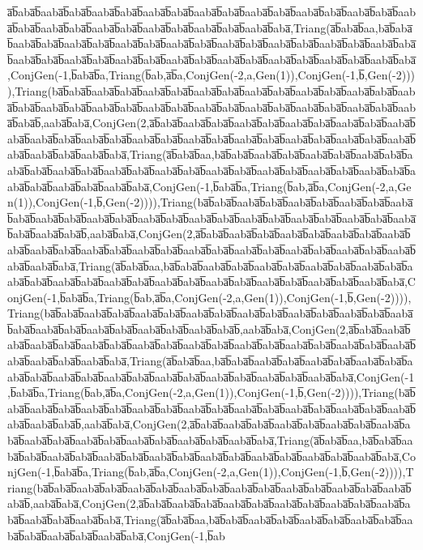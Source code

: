 a̅b̅aba̅b̅aaba̅b̅aba̅b̅aaba̅b̅aba̅b̅aaba̅b̅aba̅b̅aaba̅b̅aba̅b̅aaba̅b̅aba̅b̅aaba̅b̅aba̅b̅aaba̅b̅aba̅b̅aaba̅b̅aba̅b̅aaba̅b̅aba̅b̅aaba̅b̅aba̅b̅aaba̅b̅aba̅b̅aaba̅b̅aba̅b̅aaba̅b̅aba̅,Triang(a̅b̅aba̅b̅aa,ba̅b̅aba̅b̅aaba̅b̅aba̅b̅aaba̅b̅aba̅b̅aaba̅b̅aba̅b̅aaba̅b̅aba̅b̅aaba̅b̅aba̅b̅aaba̅b̅aba̅b̅aaba̅b̅aba̅b̅aaba̅b̅aba̅b̅aaba̅b̅aba̅b̅aaba̅b̅aba̅b̅aaba̅b̅aba̅b̅aaba̅b̅aba̅b̅aaba̅b̅aba̅b̅aaba̅b̅aba̅b̅aaba̅b̅aba̅b̅aaba̅b̅aba̅,ConjGen(-1,b̅aba̅b̅a,Triang(b̅ab,a̅b̅a,ConjGen(-2,a,Gen(1)),ConjGen(-1,b̅,Gen(-2)))),Triang(ba̅b̅aba̅b̅aaba̅b̅aba̅b̅aaba̅b̅aba̅b̅aaba̅b̅aba̅b̅aaba̅b̅aba̅b̅aaba̅b̅aba̅b̅aaba̅b̅aba̅b̅aaba̅b̅aba̅b̅aaba̅b̅aba̅b̅aaba̅b̅aba̅b̅aaba̅b̅aba̅b̅aaba̅b̅aba̅b̅aaba̅b̅aba̅b̅aaba̅b̅aba̅b̅aaba̅b̅aba̅b̅aaba̅b̅aba̅b̅,aaba̅b̅aba̅,ConjGen(2,a̅b̅aba̅b̅aaba̅b̅aba̅b̅aaba̅b̅aba̅b̅aaba̅b̅aba̅b̅aaba̅b̅aba̅b̅aaba̅b̅aba̅b̅aaba̅b̅aba̅b̅aaba̅b̅aba̅b̅aaba̅b̅aba̅b̅aaba̅b̅aba̅b̅aaba̅b̅aba̅b̅aaba̅b̅aba̅b̅aaba̅b̅aba̅b̅aaba̅b̅aba̅b̅aaba̅b̅aba̅b̅aaba̅b̅aba̅,Triang(a̅b̅aba̅b̅aa,ba̅b̅aba̅b̅aaba̅b̅aba̅b̅aaba̅b̅aba̅b̅aaba̅b̅aba̅b̅aaba̅b̅aba̅b̅aaba̅b̅aba̅b̅aaba̅b̅aba̅b̅aaba̅b̅aba̅b̅aaba̅b̅aba̅b̅aaba̅b̅aba̅b̅aaba̅b̅aba̅b̅aaba̅b̅aba̅b̅aaba̅b̅aba̅b̅aaba̅b̅aba̅b̅aaba̅b̅aba̅,ConjGen(-1,b̅aba̅b̅a,Triang(b̅ab,a̅b̅a,ConjGen(-2,a,Gen(1)),ConjGen(-1,b̅,Gen(-2)))),Triang(ba̅b̅aba̅b̅aaba̅b̅aba̅b̅aaba̅b̅aba̅b̅aaba̅b̅aba̅b̅aaba̅b̅aba̅b̅aaba̅b̅aba̅b̅aaba̅b̅aba̅b̅aaba̅b̅aba̅b̅aaba̅b̅aba̅b̅aaba̅b̅aba̅b̅aaba̅b̅aba̅b̅aaba̅b̅aba̅b̅aaba̅b̅aba̅b̅aaba̅b̅aba̅b̅,aaba̅b̅aba̅,ConjGen(2,a̅b̅aba̅b̅aaba̅b̅aba̅b̅aaba̅b̅aba̅b̅aaba̅b̅aba̅b̅aaba̅b̅aba̅b̅aaba̅b̅aba̅b̅aaba̅b̅aba̅b̅aaba̅b̅aba̅b̅aaba̅b̅aba̅b̅aaba̅b̅aba̅b̅aaba̅b̅aba̅b̅aaba̅b̅aba̅b̅aaba̅b̅aba̅b̅aaba̅b̅aba̅,Triang(a̅b̅aba̅b̅aa,ba̅b̅aba̅b̅aaba̅b̅aba̅b̅aaba̅b̅aba̅b̅aaba̅b̅aba̅b̅aaba̅b̅aba̅b̅aaba̅b̅aba̅b̅aaba̅b̅aba̅b̅aaba̅b̅aba̅b̅aaba̅b̅aba̅b̅aaba̅b̅aba̅b̅aaba̅b̅aba̅b̅aaba̅b̅aba̅b̅aaba̅b̅aba̅,ConjGen(-1,b̅aba̅b̅a,Triang(b̅ab,a̅b̅a,ConjGen(-2,a,Gen(1)),ConjGen(-1,b̅,Gen(-2)))),Triang(ba̅b̅aba̅b̅aaba̅b̅aba̅b̅aaba̅b̅aba̅b̅aaba̅b̅aba̅b̅aaba̅b̅aba̅b̅aaba̅b̅aba̅b̅aaba̅b̅aba̅b̅aaba̅b̅aba̅b̅aaba̅b̅aba̅b̅aaba̅b̅aba̅b̅aaba̅b̅aba̅b̅aaba̅b̅aba̅b̅,aaba̅b̅aba̅,ConjGen(2,a̅b̅aba̅b̅aaba̅b̅aba̅b̅aaba̅b̅aba̅b̅aaba̅b̅aba̅b̅aaba̅b̅aba̅b̅aaba̅b̅aba̅b̅aaba̅b̅aba̅b̅aaba̅b̅aba̅b̅aaba̅b̅aba̅b̅aaba̅b̅aba̅b̅aaba̅b̅aba̅b̅aaba̅b̅aba̅,Triang(a̅b̅aba̅b̅aa,ba̅b̅aba̅b̅aaba̅b̅aba̅b̅aaba̅b̅aba̅b̅aaba̅b̅aba̅b̅aaba̅b̅aba̅b̅aaba̅b̅aba̅b̅aaba̅b̅aba̅b̅aaba̅b̅aba̅b̅aaba̅b̅aba̅b̅aaba̅b̅aba̅b̅aaba̅b̅aba̅,ConjGen(-1,b̅aba̅b̅a,Triang(b̅ab,a̅b̅a,ConjGen(-2,a,Gen(1)),ConjGen(-1,b̅,Gen(-2)))),Triang(ba̅b̅aba̅b̅aaba̅b̅aba̅b̅aaba̅b̅aba̅b̅aaba̅b̅aba̅b̅aaba̅b̅aba̅b̅aaba̅b̅aba̅b̅aaba̅b̅aba̅b̅aaba̅b̅aba̅b̅aaba̅b̅aba̅b̅aaba̅b̅aba̅b̅,aaba̅b̅aba̅,ConjGen(2,a̅b̅aba̅b̅aaba̅b̅aba̅b̅aaba̅b̅aba̅b̅aaba̅b̅aba̅b̅aaba̅b̅aba̅b̅aaba̅b̅aba̅b̅aaba̅b̅aba̅b̅aaba̅b̅aba̅b̅aaba̅b̅aba̅b̅aaba̅b̅aba̅,Triang(a̅b̅aba̅b̅aa,ba̅b̅aba̅b̅aaba̅b̅aba̅b̅aaba̅b̅aba̅b̅aaba̅b̅aba̅b̅aaba̅b̅aba̅b̅aaba̅b̅aba̅b̅aaba̅b̅aba̅b̅aaba̅b̅aba̅b̅aaba̅b̅aba̅,ConjGen(-1,b̅aba̅b̅a,Triang(b̅ab,a̅b̅a,ConjGen(-2,a,Gen(1)),ConjGen(-1,b̅,Gen(-2)))),Triang(ba̅b̅aba̅b̅aaba̅b̅aba̅b̅aaba̅b̅aba̅b̅aaba̅b̅aba̅b̅aaba̅b̅aba̅b̅aaba̅b̅aba̅b̅aaba̅b̅aba̅b̅aaba̅b̅aba̅b̅,aaba̅b̅aba̅,ConjGen(2,a̅b̅aba̅b̅aaba̅b̅aba̅b̅aaba̅b̅aba̅b̅aaba̅b̅aba̅b̅aaba̅b̅aba̅b̅aaba̅b̅aba̅b̅aaba̅b̅aba̅b̅aaba̅b̅aba̅,Triang(a̅b̅aba̅b̅aa,ba̅b̅aba̅b̅aaba̅b̅aba̅b̅aaba̅b̅aba̅b̅aaba̅b̅aba̅b̅aaba̅b̅aba̅b̅aaba̅b̅aba̅b̅aaba̅b̅aba̅,ConjGen(-1,b̅ab